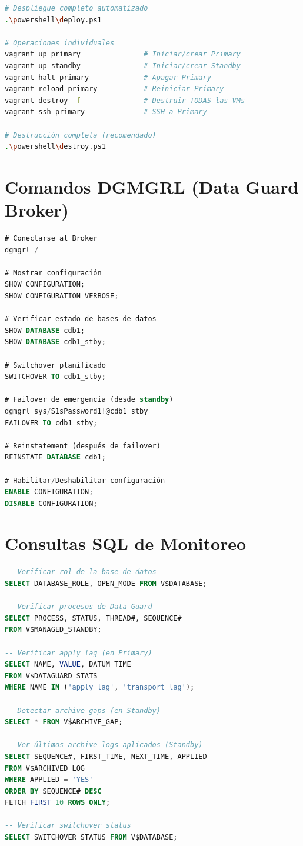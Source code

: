 \documentclass[11pt, a4paper]{report}
\begin{document}
\begin{lstlisting}[language=bash, caption={Operaciones con Vagrant}]
# Despliegue completo automatizado
.\powershell\deploy.ps1

# Operaciones individuales
vagrant up primary               # Iniciar/crear Primary
vagrant up standby               # Iniciar/crear Standby
vagrant halt primary             # Apagar Primary
vagrant reload primary           # Reiniciar Primary
vagrant destroy -f               # Destruir TODAS las VMs
vagrant ssh primary              # SSH a Primary

# Destrucción completa (recomendado)
.\powershell\destroy.ps1
\end{lstlisting}

\section{Comandos DGMGRL (Data Guard Broker)}

\begin{lstlisting}[language=SQL, caption={Operaciones con Data Guard Broker}]
# Conectarse al Broker
dgmgrl /

# Mostrar configuración
SHOW CONFIGURATION;
SHOW CONFIGURATION VERBOSE;

# Verificar estado de bases de datos
SHOW DATABASE cdb1;
SHOW DATABASE cdb1_stby;

# Switchover planificado
SWITCHOVER TO cdb1_stby;

# Failover de emergencia (desde standby)
dgmgrl sys/S1sPassword1!@cdb1_stby
FAILOVER TO cdb1_stby;

# Reinstatement (después de failover)
REINSTATE DATABASE cdb1;

# Habilitar/Deshabilitar configuración
ENABLE CONFIGURATION;
DISABLE CONFIGURATION;
\end{lstlisting}

\section{Consultas SQL de Monitoreo}

\begin{lstlisting}[language=SQL, caption={Verificación de Estado Data Guard}]
-- Verificar rol de la base de datos
SELECT DATABASE_ROLE, OPEN_MODE FROM V$DATABASE;

-- Verificar procesos de Data Guard
SELECT PROCESS, STATUS, THREAD#, SEQUENCE#
FROM V$MANAGED_STANDBY;

-- Verificar apply lag (en Primary)
SELECT NAME, VALUE, DATUM_TIME
FROM V$DATAGUARD_STATS
WHERE NAME IN ('apply lag', 'transport lag');

-- Detectar archive gaps (en Standby)
SELECT * FROM V$ARCHIVE_GAP;

-- Ver últimos archive logs aplicados (Standby)
SELECT SEQUENCE#, FIRST_TIME, NEXT_TIME, APPLIED
FROM V$ARCHIVED_LOG
WHERE APPLIED = 'YES'
ORDER BY SEQUENCE# DESC
FETCH FIRST 10 ROWS ONLY;

-- Verificar switchover status
SELECT SWITCHOVER_STATUS FROM V$DATABASE;
\end{lstlisting}
\end{document}
